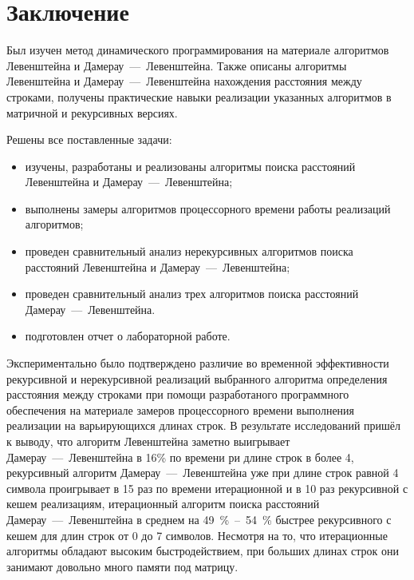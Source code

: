 \chapter*{Заключение}

Был изучен метод динамического программирования на материале алгоритмов Левенштейна и Дамерау~---~Левенштейна. Также описаны алгоритмы Левенштейна и Дамерау~---~Левенштейна нахождения расстояния между строками, получены практические навыки реализации указанных алгоритмов в матричной и рекурсивных версиях.

Решены все поставленные задачи:

\begin{itemize}
	\item изучены, разработаны и реализованы алгоритмы поиска расстояний Левенштейна и Дамерау~---~Левенштейна;
    \item выполнены замеры алгоритмов процессорного времени работы реализаций алгоритмов;
	\item проведен сравнительный анализ нерекурсивных алгоритмов поиска расстояний Левенштейна и Дамерау~---~Левенштейна;
	\item проведен сравнительный анализ трех алгоритмов поиска расстояний Дамерау~---~Левенштейна.
	\item подготовлен отчет о лабораторной работе.
\end{itemize}

Экспериментально было подтверждено различие во временной эффективности рекурсивной и нерекурсивной реализаций выбранного алгоритма определения расстояния между строками при помощи разработаного программного обеспечения на материале замеров процессорного времени выполнения реализации на варьирующихся длинах строк.
В результате исследований пришёл к выводу, что алгоритм Левенштейна заметно выигрывает Дамерау~---~Левенштейна в 16\% по времени ри длине строк в более 4, рекурсивный алгоритм Дамерау~---~Левенштейна уже при длине строк равной 4 символа проигрывает в 15 раз по времени итерационной и в 10 раз рекурсивной с кешем реализациям, итерационный алгоритм поиска расстояний Дамерау~---~Левенштейна в среднем на 49~\%~--~54~\% быстрее рекурсивного с кешем для длин строк от 0 до 7 символов. Несмотря на то, что итерационные алгоритмы обладают высоким быстродействием, при больших длинах строк они занимают довольно много памяти под матрицу.